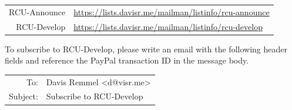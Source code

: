 \documentclass{memoir}
\begin{document}
{\vspace{0.5cm}
\begin{tabular}{rl}
RCU-Announce& \href{https://lists.davisr.me/mailman/listinfo/rcu-announce}{https://lists.davisr.me/mailman/listinfo/rcu-announce} \\
RCU-Develop& \href{https://lists.davisr.me/mailman/listinfo/rcu-develop}{https://lists.davisr.me/mailman/listinfo/rcu-develop}
\end{tabular}
\vspace{0.5cm}

To subscribe to RCU-Develop, please write an email with the following header fields and reference the PayPal transaction ID in the message body.

\vspace{0.5cm}
\begin{tabular}{rl}
To:& Davis Remmel \textless d@visr.me\textgreater \\
Subject:& Subscribe to RCU-Develop
\end{tabular}







}
\end{document}
